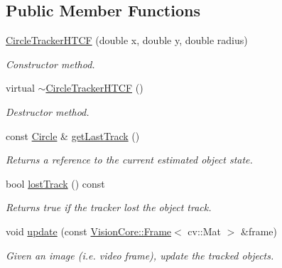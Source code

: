 \subsection*{Public Member Functions}
\begin{DoxyCompactItemize}
\item 
\hypertarget{class_viscv_1_1_circle_tracker_h_t_c_f_a925ba52aa4c7a0bbbedbcc3bc53b84ad}{}\hyperlink{class_viscv_1_1_circle_tracker_h_t_c_f_a925ba52aa4c7a0bbbedbcc3bc53b84ad}{Circle\+Tracker\+H\+T\+C\+F} (double x, double y, double radius)\label{class_viscv_1_1_circle_tracker_h_t_c_f_a925ba52aa4c7a0bbbedbcc3bc53b84ad}

\begin{DoxyCompactList}\small\item\em Constructor method. \end{DoxyCompactList}\item 
\hypertarget{class_viscv_1_1_circle_tracker_h_t_c_f_ab7bb92a06e7f731d7a4b1782f5b00d7b}{}virtual \hyperlink{class_viscv_1_1_circle_tracker_h_t_c_f_ab7bb92a06e7f731d7a4b1782f5b00d7b}{$\sim$\+Circle\+Tracker\+H\+T\+C\+F} ()\label{class_viscv_1_1_circle_tracker_h_t_c_f_ab7bb92a06e7f731d7a4b1782f5b00d7b}

\begin{DoxyCompactList}\small\item\em Destructor method. \end{DoxyCompactList}\item 
const \hyperlink{class_viscv_1_1_circle}{Circle} \& \hyperlink{class_viscv_1_1_circle_tracker_h_t_c_f_a0dcaebc9de9ff2ad85ef0a7ec554c363}{get\+Last\+Track} ()
\begin{DoxyCompactList}\small\item\em Returns a reference to the current estimated object state. \end{DoxyCompactList}\item 
bool \hyperlink{class_viscv_1_1_circle_tracker_h_t_c_f_ac7e0977fa702f98038bbe303df458a6c}{lost\+Track} () const 
\begin{DoxyCompactList}\small\item\em Returns true if the tracker lost the object track. \end{DoxyCompactList}\item 
\hypertarget{class_viscv_1_1_circle_tracker_h_t_c_f_ab233da15b6c7aad7d83c67057a558bd4}{}void \hyperlink{class_viscv_1_1_circle_tracker_h_t_c_f_ab233da15b6c7aad7d83c67057a558bd4}{update} (const \hyperlink{struct_vision_core_1_1_data_structures_1_1_frame}{Vision\+Core\+::\+Frame}$<$ cv\+::\+Mat $>$ \&frame)\label{class_viscv_1_1_circle_tracker_h_t_c_f_ab233da15b6c7aad7d83c67057a558bd4}

\begin{DoxyCompactList}\small\item\em Given an image (i.\+e. video frame), update the tracked objects. \end{DoxyCompactList}\end{DoxyCompactItemize}
